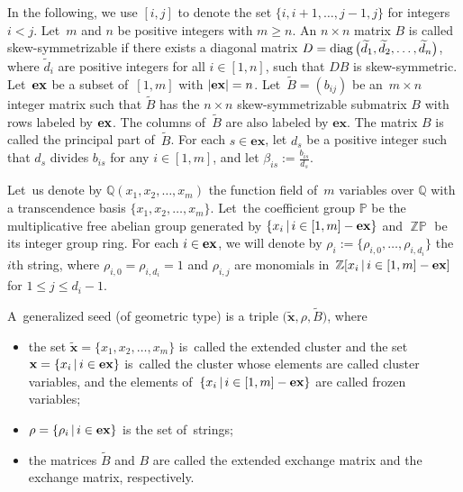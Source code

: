 \documentclass[pdftex]{sigma}
\numberwithin{equation}{section}
\begin{document}
In the following, we use $[i,j]$ to denote the set $\{i,i+1,\ldots,j-1,j\}$ for integers $i<j$. Let~$m$ and $n$ be positive integers with $m\geq n$.
An $n\times n$ matrix $B$ is called skew-symmetrizable
if there exists a diagonal matrix $D=\mathop{\rm diag}\big(\widetilde{d}_1,\widetilde{d}_2,\ldots,\widetilde{d}_n\big)$, where $\widetilde{d}_i$ are positive integers for all $i\in[1,n]$, such that $DB$ is skew-symmetric.
Let~${\rm\mathbf{ex}}$ be a subset of~$[1,m]$ with $|{\rm\mathbf{ex}}|=n$.
Let~$\widetilde{B}=(b_{ij})$ be an~$m\times n$ integer matrix such that $\widetilde{B}$ has the $n\times n$ skew-symmetrizable submatrix $B$ with rows labeled by ${\rm\mathbf{ex}}$.
The columns of~$\widetilde{B}$ are also labeled by $\mathbf{ex}$.
The matrix $B$ is called the principal part of~$\widetilde{B}$.
For each $s \in \mathbf{ex}$, let $d_s$ be a positive integer such that $d_s$ divides $b_{is}$ for any $i\in[1,m]$, and let $\beta_{is}:=\frac{b_{is}}{d_s}$.

Let~us denote by $\mathbb{Q}(x_{1},x_2,\ldots,x_{m})$ the function field of~$m$ variables over $\mathbb{Q}$ with a transcendence basis $\{x_1,x_2,\ldots,x_m\}$. Let~the coefficient group $\mathbb{P}$ be the multiplicative free abelian group generated by $\{x_{i}\,|\, i\in[1,m]-{\rm\mathbf{ex}} \}$ and $\mathop{\mathbb{ZP}}$ be its integer group ring.
For each $i\in{\rm\mathbf{ex}}$, we will denote by $\rho_i:=\{\rho_{i,0},\ldots,\rho_{i,d_i}\}$ the $i$th string, where $\rho_{i,0}=\rho_{i,d_i}=1$ and $\rho_{i,j}$ are monomials in~$\mathbb{Z} [x_{i}\,|\, i\in{[1,m]-\rm\mathbf{ex}}]$ for $1\leq j\leq d_i-1$.

\begin{Definition}\label{def of generalized seed}
A~generalized seed (of geometric type) is a triple $\big(\widetilde{\mathbf{x}},\rho,\widetilde{B}\big)$, where
\begin{itemize}\itemsep=0pt
 \item[(1)] the set $\widetilde{\mathbf{x}}=\{x_{1},x_2,\ldots,x_{m}\}$ is~called the extended cluster and the set $\mathbf{x}=\{x_{i}\,|\, i\in{\rm\mathbf{ex}}\}$ is~called the cluster
 whose elements are called cluster variables, and the elements of~$\{x_{i}\,|\, i\in[1,m]-{\rm\mathbf{ex}}\}$ are called frozen variables;
 \item[(2)] $\rho=\{\rho_{i}\,|\, i\in{\rm\mathbf{ex}}\}$ is the set of~strings;
 \item[(3)] the matrices $\widetilde{B}$ and $B$ are called the extended exchange matrix and the exchange matrix, respectively.
\end{itemize}
\end{Definition}
\end{document}
